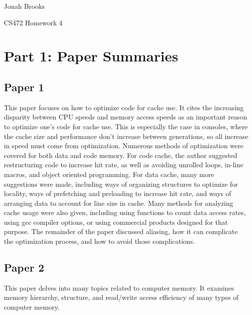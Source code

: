\documentclass[letterpaper,10pt,titlepage]{article}
\begin{document}
Jonah Brooks

CS472 Homework 4

\section*{Part 1: Paper Summaries}

\subsection*{Paper 1}

This paper focuses on how to optimize code for cache use.
It cites the increasing disparity between CPU speeds and memory access speeds as an important reason to optimize one's code for cache use.
This is especially the case in consoles, where the cache size and performance don't increase between generations, so all increase in speed must come from optimization.
Numerous methods of optimization were covered for both data and code memory.
For code cache, the author suggested restructuring code to increase hit rate, as well as avoiding unrolled loops, in-line macros, and object oriented programming.
For data cache, many more suggestions were made, including ways of organizing structures to optimize for locality,
ways of prefetching and preloading to increase hit rate, and ways of arranging data to account for line size in cache.
Many methods for analyzing cache usage were also given, including using functions to count data access rates, using gcc compiler options, or using commercial products designed for that purpose.
The remainder of the paper discussed aliasing, how it can complicate the optimization process, and how to avoid those complications.

\subsection*{Paper 2}

This paper delves into many topics related to computer memory.
It examines memory hierarchy, structure, and read/write access efficiency of many types of computer memory.
\end{document}
